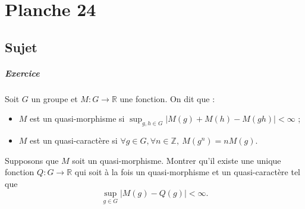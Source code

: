 \chapter{Planche 24}

\section{Sujet}

\paragraph{Exercice}
Soit $G$ un groupe et $M : G \to \mathbb R$ une fonction. On dit que :
\begin{itemize}
    \item $M$ est un quasi-morphisme si $\sup_{g,h \in G} |M(g) + M(h) - M(gh)| < \infty$ ;
    \item $M$ est un quasi-caractère si $\forall g \in G,\forall n\in \mathbb Z,\ M(g^n) = nM(g).$
\end{itemize}
Supposons que $M$ soit un quasi-morphisme. Montrer qu'il existe une unique fonction $Q : G \to \mathbb R$ qui soit à la fois un quasi-morphisme et un quasi-caractère tel que
\[
\sup_{g\in G} |M(g) - Q(g)| < \infty.
\]

